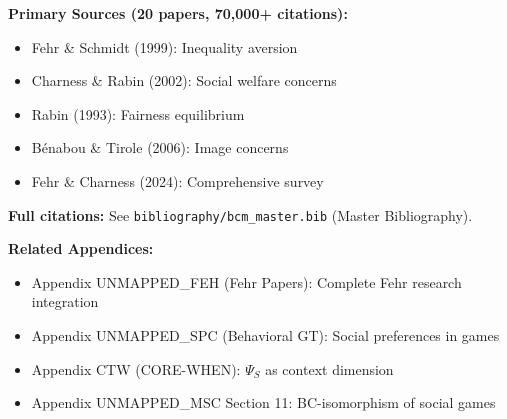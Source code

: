\textbf{Primary Sources (20 papers, 70,000+ citations):}
\begin{itemize}[nosep]
    \item Fehr \& Schmidt (1999): Inequality aversion
    \item Charness \& Rabin (2002): Social welfare concerns
    \item Rabin (1993): Fairness equilibrium
    \item Bénabou \& Tirole (2006): Image concerns
    \item Fehr \& Charness (2024): Comprehensive survey
\end{itemize}

\textbf{Full citations:} See \texttt{bibliography/bcm\_master.bib} (Master Bibliography).

\textbf{Related Appendices:}
\begin{itemize}[nosep]
    \item Appendix UNMAPPED_FEH (Fehr Papers): Complete Fehr research integration
    \item Appendix UNMAPPED_SPC (Behavioral GT): Social preferences in games
    \item Appendix CTW (CORE-WHEN): $\Psi_S$ as context dimension
    \item Appendix UNMAPPED_MSC Section 11: BC-isomorphism of social games
\end{itemize}

